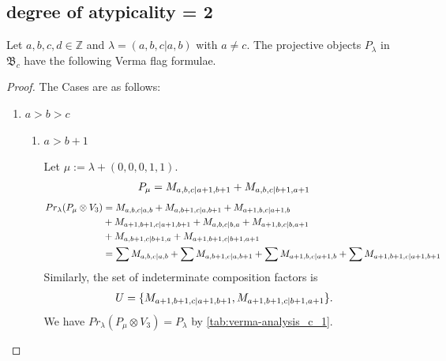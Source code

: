 

\subsection{degree of atypicality = 2}
\begin{theorem}
  Let $a,b,c,d \in \mathbb{Z}$ and $\lambda = (a,b,c|a,b)$ with $a \neq c$. The projective objects $P_{\lambda}$ in $\mathfrak{B}_{c}$ have the following Verma flag formulae.
\end{theorem}
\begin{proof} The Cases are as follows:\par
  \begin{enumerate}
    \item $a>b>c$
      \begin{enumerate}
        \item $a>b+1$ \par
        Let $\mu:=\lambda + (0,0,0,1,1) $.
        \begin{equation}\notag
          \begin{aligned}
            P_\mu = M_{a,b,c|a+1,b+1}
+ M_{a,b,c|b+1,a+1}
          \end{aligned}
        \end{equation}
        \begin{equation}\notag
          \begin{aligned}
            Pr_{\lambda}(P_\mu \otimes V_{3}) &=
M_{a,b,c|a,b}
+ M_{a,b+1,c|a,b+1}
+ M_{a+1,b,c|a+1,b}\\
                                              &
+ M_{a+1,b+1,c|a+1,b+1}
+ M_{a,b,c|b,a}
+ M_{a+1,b,c|b,a+1}\\
                                              &
+ M_{a,b+1,c|b+1,a}
+ M_{a+1,b+1,c|b+1,a+1} \\
                                               &=
\sum M_{a,b,c|a,b}
+ \sum M_{a,b+1,c|a,b+1}
+ \sum M_{a+1,b,c|a+1,b}
+ \sum M_{a+1,b+1,c|a+1,b+1}
          \end{aligned}
        \end{equation}
      Similarly, the set of indeterminate composition factors is 
\begin{equation}\notag
  \begin{aligned}
    U = \{
M_{a+1,b+1,c|a+1,b+1},
M_{a+1,b+1,c|b+1,a+1}
\}.
  \end{aligned}
\end{equation}
       We have $Pr_{\lambda}(P_\mu \otimes V_{3}) = P_\lambda  $ by \cref{tab:verma-analysis_c_1}.

\end{enumerate}
\end{enumerate}
\end{proof}
